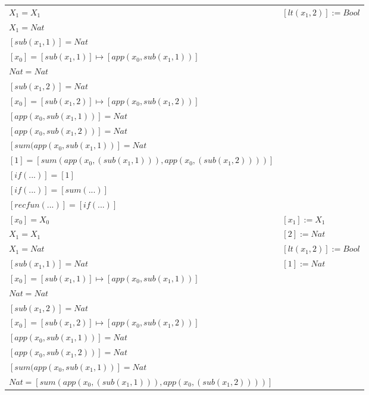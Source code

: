 \begin{exercise}
\begin{description}
\begin{center}
\begin{longtable}{ | l | l | }
                        $X_1 = X_1$ & $[lt(x_1 , 2)] := Bool$\\
                        $X_1 = Nat$ & \\
                        $[sub(x_1,1)] = Nat$ & \\
                        $[x_0] = [sub(x_1,1)] \mapsto [app(x_0, sub(x_1,1))]$ & \\
                        $Nat = Nat$ & \\
                        $[sub(x_1,2)] = Nat$ & \\
                        $[x_0] =[sub(x_1,2)] \mapsto [app(x_0, sub(x_1,2))]$ & \\
                        $[app(x_0, sub(x_1,1))] = Nat$ & \\
                        $[app(x_0, sub(x_1,2))] = Nat$ & \\
                        $[sum(app(x_0, sub(x_1,1))] = Nat$ & \\
                        $[1] = [sum(app(x_0, (sub(x_1,1))), app(x_0, (sub(x_1,2))))]$ & \\
                        $[if(...)] = [1]$ & \\
                        $[if(...)] = [sum(...)]$ & \\
                        $[recfun(...)] = [if(...)]$ & \\
                    \hline
                        $[x_0] = X_0$ & $[x_1] := X_1$ \\
                        $X_1 = X_1$ & $[2] := Nat$ \\
                        $X_1 = Nat$ & $[lt(x_1 , 2)] := Bool$ \\
                        $[sub(x_1,1)] = Nat$ & $[1] := Nat$ \\
                        $[x_0] = [sub(x_1,1)] \mapsto [app(x_0, sub(x_1,1))]$ & \\
                        $Nat = Nat$ & \\
                        $[sub(x_1,2)] = Nat$ & \\
                        $[x_0] =[sub(x_1,2)] \mapsto [app(x_0, sub(x_1,2))]$ & \\
                        $[app(x_0, sub(x_1,1))] = Nat$ & \\
                        $[app(x_0, sub(x_1,2))] = Nat$ & \\
                        $[sum(app(x_0, sub(x_1,1))] = Nat$ & \\
                        $Nat = [sum(app(x_0, (sub(x_1,1))), app(x_0, (sub(x_1,2))))]$ & \\

\end{longtable}
\end{center}
\end{description}
\end{exercise}
